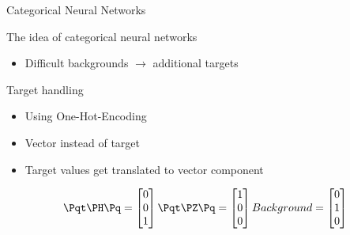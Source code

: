 \begin{frame}
    \begin{center}
        \Huge Categorical Neural Networks
    \end{center}
\end{frame}

\begin{frame}{The idea of categorical neural networks}
    \begin{itemize}
        \item \Large Difficult backgrounds $\rightarrow$ additional targets
    \end{itemize}
\end{frame}

\begin{frame}{Target handling}
    \begin{itemize}
        \item Using One-Hot-Encoding
        \vspace{0.23cm}
        \item Vector instead of target
        \vspace{0.23cm}
        \item Target values get translated to vector component
    \end{itemize}
    \vspace{0.23cm}
    \begin{equation*}
    \tHq = \begin{bmatrix}
           0 \\
           0 \\
           1
         \end{bmatrix}
    \tZq = \begin{bmatrix}
           1 \\
           0 \\
           0
         \end{bmatrix}
    Background = \begin{bmatrix}
           0 \\
           1 \\
           0
         \end{bmatrix}
    \end{equation*}
\end{frame}

